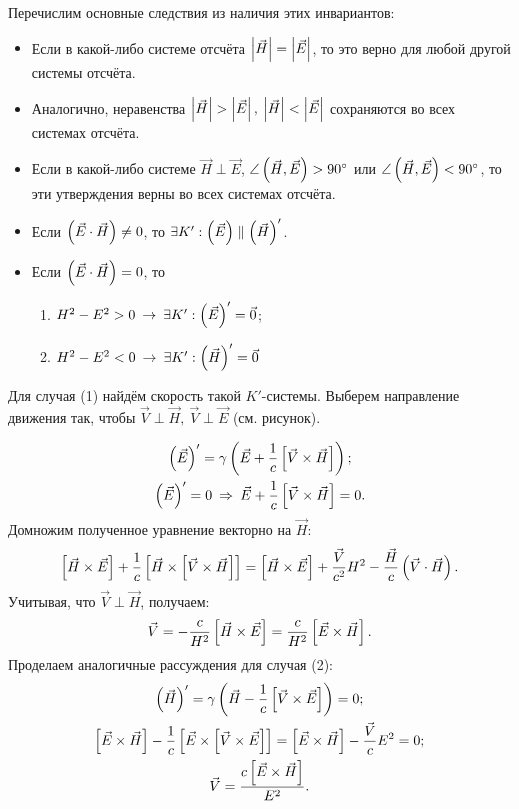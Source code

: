     Перечислим основные следствия из наличия этих инвариантов:
    \begin{itemize}
        \item Если в какой-либо системе отсчёта $\left|{\vec{H}}\right| = \left|{\vec{E}}\right|$, то это верно для любой другой системы отсчёта.
        \item Аналогично, неравенства $\left|{\vec{H}}\right| > \left|{\vec{E}}\right|, \: \left|{\vec{H}}\right| < \left|{\vec{E}}\right|$ сохраняются во
            всех системах отсчёта.
        \item Если в какой-либо системе $\vec{H} \perp \vec{E}$, $\angle\left({\vec{H}, \vec{E}}\right) > 90\degree$ или $\angle\left({\vec{H}, \vec{E}}\right) < 90\degree$,
            то эти утверждения верны во всех системах отсчёта.
        \item Если $\left({\vec{E}\cdot\vec{H}}\right) \not= 0$, то $\exists K' : \left({\vec{E}}\right) \parallel \left({\vec{H}}\right)'$.
        \item Если $\left({\vec{E}\cdot\vec{H}}\right) = 0$, то
            \begin{enumerate}
                \item $ H^2 - E^2 > 0 \: \rightarrow \: \exists K' : \left({\vec{E}}\right)' = \vec{0} $;
                \item $ H^2 - E^2 < 0 \: \rightarrow \: \exists K' : \left({\vec{H}}\right)' = \vec{0} $
            \end{enumerate}
    \end{itemize}
    \begin{example}
        Для случая (1) найдём скорость такой $K'$-системы. Выберем направление движения так, чтобы $\vec{V} \perp \vec{H}, \: \vec{V} \perp \vec{E}$ (см. рисунок).
        \begin{figure} [h]
            \centering
            
        \end{figure}
        \begin{gather*}
           \left({\vec{E}}\right)' = \gamma\left({\vec{E} + \frac 1c \left[{\vec{V}\times\vec{H}}\right]}\right); \\
           \left({\vec{E}}\right)' = 0 \: \Rightarrow \: \vec{E} + \frac 1c \left[{\vec{V}\times\vec{H}}\right] = 0. \\
        \end{gather*}
        Домножим полученное уравнение векторно на $\vec{H}$:
        \[
           \left[{\vec{H}\times\vec{E}}\right] + \frac 1c \left[{\vec{H}\times\left[{\vec{V}\times\vec{H}}\right]}\right] = \left[{\vec{H}\times\vec{E}}\right] + \frac{\vec{V}}{c^2}H^2 - \frac{\vec{H}}{c}\left({\vec{V}\cdot\vec{H}}\right).
        \]
        Учитывая, что $\vec{V} \perp \vec{H}$, получаем:
        \[
            \vec{V} = -\frac{c}{H^2}\left[{\vec{H}\times\vec{E}}\right] = \frac{c}{H^2}\left[{\vec{E}\times\vec{H}}\right].
        \]
        Проделаем аналогичные рассуждения для случая (2):
        \begin{gather*}
            \left({\vec{H}}\right)' = \gamma\left({\vec{H} - \frac{1}{c}\left[{\vec{V}\times\vec{E}}\right]}\right) = 0; \\
            \left[{\vec{E}\times\vec{H}}\right] - \frac 1c \left[{\vec{E}\times\left[{\vec{V}\times\vec{E}}\right]}\right] = \left[{\vec{E}\times\vec{H}}\right] - \frac{\vec{V}}{c}E^2 = 0; \\
            \vec{V} = \frac{c\left[{\vec{E}\times\vec{H}}\right]}{E^2}.
        \end{gather*}
    \end{example}

